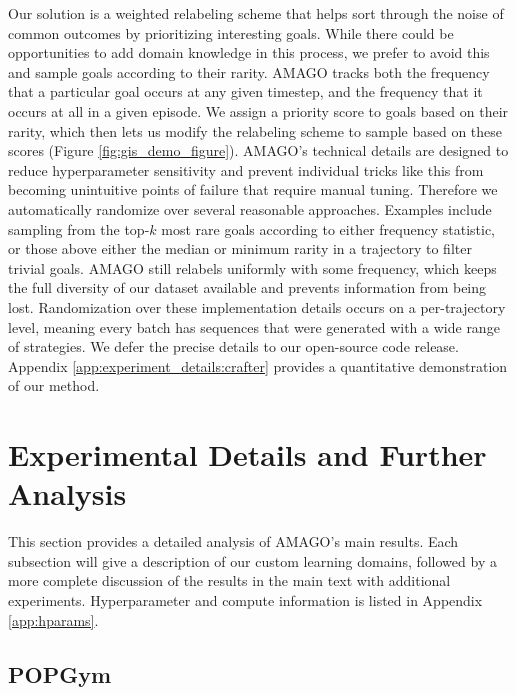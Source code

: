 Our solution is a weighted relabeling scheme that helps sort through the noise of common outcomes by prioritizing interesting goals. While there could be opportunities to add domain knowledge in this process, we prefer to avoid this and sample goals according to their rarity. AMAGO tracks both the frequency that a particular goal occurs at any given timestep, and the frequency that it occurs at all in a given episode. We assign a priority score to goals based on their rarity, which then lets us modify the relabeling scheme to sample based on these scores (Figure \ref{fig:gis_demo_figure}). AMAGO's technical details are designed to reduce hyperparameter sensitivity and prevent individual tricks like this from becoming unintuitive points of failure that require manual tuning. Therefore we automatically randomize over several reasonable approaches. Examples include sampling from the top-$k$ most rare goals according to either frequency statistic, or those above either the median or minimum rarity in a trajectory to filter trivial goals. AMAGO still relabels uniformly with some frequency, which keeps the full diversity of our dataset available and prevents information from being lost. Randomization over these implementation details occurs on a per-trajectory level, meaning every batch has sequences that were generated with a wide range of strategies. We defer the precise details to our open-source code release. Appendix \ref{app:experiment_details:crafter} provides a quantitative demonstration of our method.


\section{Experimental Details and Further Analysis}
\label{app:experiment_details}

This section provides a detailed analysis of AMAGO's main results. Each subsection will give a description of our custom learning domains, followed by a more complete discussion of the results in the main text with additional experiments. Hyperparameter and compute information is listed in Appendix \ref{app:hparams}.

\subsection{POPGym}
\label{app:experiment_details:popgym}

